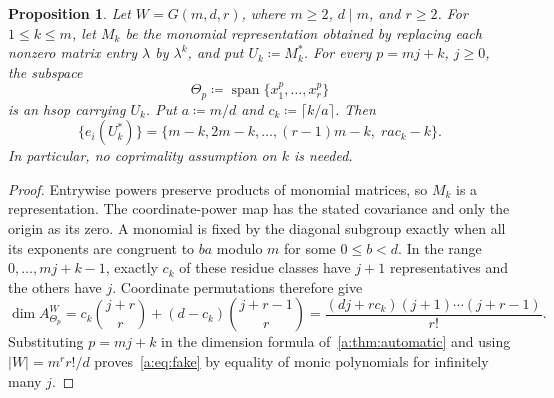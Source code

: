 \documentclass[10pt,a4paper]{amsart}
\newcommand{\defeq}{\coloneqq}
\newtheorem{proposition}[theorem]{Proposition}
\theoremstyle{definition}
\begin{document}
\begin{proposition}\label{a:prop:monomial}
Let $W=G(m,d,r)$, where $m\ge2$, $d\mid m$, and $r\ge2$. For
$1\le k\le m$, let $M_k$ be the monomial representation obtained by
replacing each nonzero matrix entry $\lambda$ by $\lambda^k$, and put
$U_k\defeq M_k^*$. For every $p=mj+k$, $j\ge0$, the subspace
\[
 \Theta_p\defeq\operatorname{span}\{x_1^p,\ldots,x_r^p\}
\]
is an hsop carrying $U_k$. Put $a\defeq m/d$ and $c_k\defeq\lceil k/a\rceil$.
Then
\begin{equation}\label{a:eq:fake}
 \{e_i(U_k^*)\}
 =\{m-k,2m-k,\ldots,(r-1)m-k,\;ra c_k-k\}.
\end{equation}
In particular, no coprimality assumption on $k$ is needed.
\end{proposition}

\begin{proof}
Entrywise powers preserve products of monomial matrices, so $M_k$ is
a representation. The coordinate-power map has the stated covariance
and only the origin as its zero. A monomial is fixed by the diagonal
subgroup exactly when all its exponents are congruent to $ba$ modulo
$m$ for some $0\le b<d$. In the range $0,\ldots,mj+k-1$, exactly
$c_k$ of these residue classes have $j+1$ representatives and the others
have $j$. Coordinate permutations therefore give
\[
 \dim A_{\Theta_p}^W=c_k\binom{j+r}{r}+(d-c_k)\binom{j+r-1}{r}
 =\frac{(dj+rc_k)(j+1)\cdots(j+r-1)}{r!}.
\]
Substituting $p=mj+k$ in the dimension formula of~\cref{a:thm:automatic} and using
$|W|=m^r r!/d$ proves~\cref{a:eq:fake} by equality of monic polynomials
for infinitely many $j$.
\end{proof}
\end{document}
